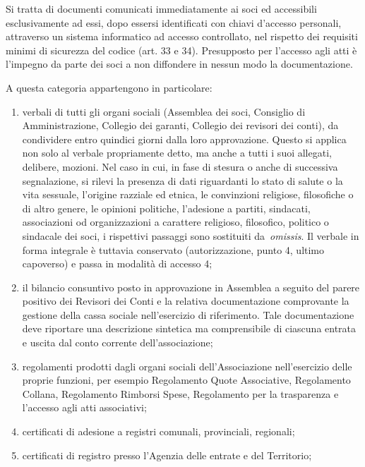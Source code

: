 Si tratta di documenti comunicati immediatamente ai soci ed accessibili
esclusivamente ad essi, dopo essersi identificati con chiavi d’accesso
personali, attraverso un sistema informatico ad accesso controllato, nel
rispetto dei requisiti minimi di sicurezza del codice (art. 33 e 34).
Presupposto per l’accesso agli atti è l’impegno da parte dei soci a non
diffondere in nessun modo la documentazione.  

A questa categoria appartengono in particolare:

\begin{enumerate}
    \item verbali di tutti gli organi sociali (Assemblea dei soci, Consiglio
        di Amministrazione, Collegio dei garanti, Collegio dei revisori dei
        conti), da condividere entro quindici giorni dalla loro
        approvazione. Questo si applica non solo al verbale propriamente
        detto, ma anche a tutti i suoi allegati, delibere, mozioni.
        Nel caso in cui, in fase di stesura o anche di successiva segnalazione, si
        rilevi la presenza di dati riguardanti lo stato di salute o la vita
        sessuale, l’origine razziale ed etnica, le convinzioni religiose,
        filosofiche o di altro genere, le opinioni politiche, l’adesione a partiti,
        sindacati, associazioni od organizzazioni a carattere religioso, filosofico,
        politico o sindacale dei soci, i rispettivi passaggi sono sostituiti
        da \emph{omissis}. Il verbale in forma integrale è tuttavia conservato
        (autorizzazione, punto 4, ultimo capoverso) e passa in modalità di accesso
        4;
    \item il bilancio consuntivo posto in approvazione in Assemblea a seguito
        del parere positivo dei Revisori dei Conti e la relativa
        documentazione comprovante la gestione della cassa sociale
        nell’esercizio di riferimento. Tale documentazione deve riportare
        una descrizione sintetica ma comprensibile di ciascuna entrata e uscita
        dal conto corrente dell'associazione;
    \item regolamenti prodotti dagli organi sociali dell'Associazione
        nell'esercizio delle proprie funzioni, per esempio Regolamento Quote
        Associative, Regolamento Collana, Regolamento Rimborsi Spese,
        Regolamento per la trasparenza e l'accesso agli atti associativi;
    \item certificati di adesione a registri comunali, provinciali, regionali;
    \item certificati di registro presso l’Agenzia delle entrate e del Territorio;

\end{enumerate}
